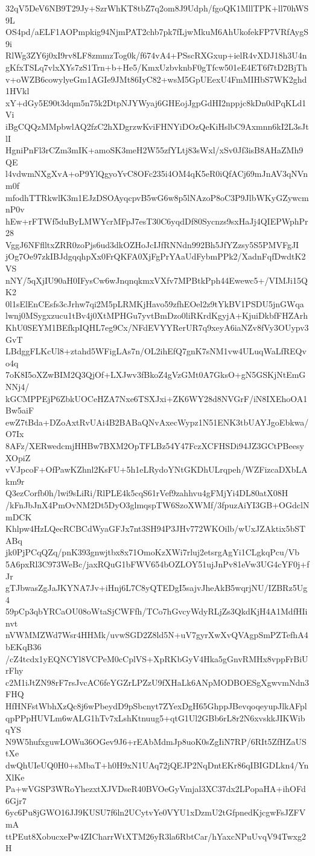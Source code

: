 32qV5DeV6NB9T29Jy+SzrWhKT8tbZ7q2om8J9Udph/fgoQK1MllTPK+ll70hWS9L
OS4pd/aELF1AOPmpkig94NjmPAT2chb7pk7fLjwMkuM6AhUkofekFP7VRfAygS9i
RlWg3ZY6j0xI9rv8LF8zmmzTog0k/f674vA4+PSscRXGxup+ielR4vXDJ18h3U4n
gKfxTSLq7vlxXYs7zS1Trn+b+He5/KmxUzbvknbF0gTfcw501eE4ET6f7tD2BjTh
v+oWZB6cowylyeGm1AGIe9JMt86IyC82+wsM5GpUEexU4FmMIHbS7WK2ghd1HVkl
xY+dGy5E90t3dqm5n75k2DtpNJYWyaj6GHEojJgpGdHI2nppjc8kDn0dPqKLd1Vi
iBgCQQzMMpbwlAQ2fzC2hXDgrzwKviFHNYiDOzQeKiHslbC9Axmnn6kI2L3sJtlI
HgniPnFl3rCZm3mIK+amoSK3meH2W55zfYLtj83sWxl/xSv0Jf3isB8AHaZMh9QE
l4vdwmNXgXvA+oP9YlQgyoYvC8OFc235i4OM4qK5eR0iQfACj69mJnAV3qNVnm0f
mfodhTTRkwlK3m1EJzDSOAyqcpvB5wG6w8p5lNAzoP8oC3P9JlbWKyGZywcmnP0v
hEw+rFTWf5duByLMWYcrMFpJ7esT30C6yqdDf80Sycnzs9sxHaJj4QIEPWphPr28
VggJ6NFflltxZRR0zoPjs6ud3dkOZHoJcIJfRNNdn992Bh5JfYZzsy5S5PMVFgJI
jOg7Oe97zkIBJdgqqhpXx0FrQKFA0XjFgPrYAaUdFybmPPk2/XadnFqfDwdtK2VS
nNY/5qXjIU90aH0IFysCw6wJnqnqkmxVXfv7MPBtkPph44Ewewc5+/VIMJi15QK2
0l1sElEnCEsfs3cJrhw7qi2M5pLRMKjHavo59zfhEOel2z9tYkBV1PSDU5jnGWqa
lwnj0MSygxzucu1tBv4j0XtMPHGu7yvtBmDzo0liRKrdKgyjA+KjuiDkbfFHZArh
KhU0SEYM1BEfkpIQHL7eg9Cx/NFdEVYYRerUR7q9xeyA6iaNZv8fVy3OUypv3GvT
LBdggFLKcUl8+ztahd5WFigLAs7n/OL2ihEfQ7gnK7sNM1vw4ULuqWaLfREQvo4q
7oK8I5oXZwBIM2Q3QjOf+LXJwv3fBkoZ4gVzGMt0A7GksO+gN5GSKjNtEmGNNj4/
kGCMPPEjP6ZbkUOCeHZA7Nxe6TSXJxi+ZK6WY28d8NVGrF/iN8IXEhoOA1Bw5aiF
ewZ7tBda+DZoAxtRvUAi4B2BABaQNvAxecWypz1N51ENK3tbUAYJgoEbkwa/O7Ix
8AFz/XERwedcmjHHBw7BXM2OpTFLBz54Y47FczXCFHSDi94JZ3GCtPBeesyXOpiZ
vVJpcoF+OfPawKZhnl2KsFU+5h1eLRydoYNtGKDhULrqpeh/WZFizcaDXbLAkm9r
Q3ezCorfb0h/lwi9sLiRi/RlPLE4k5cqS61rVef9zahhvu4gFMjYi4DL80atX08H
/kFnJbJnX4PmOvNM2Dt5DyO3glmqspTW6SzoXWMf/3fpuzAiYI3GB+OGdclNmDCK
Khlpw4HzLQecRCBCdWyaGFJx7nt3SH94P3JHv772WKOilb/wUxJZAktix5bSTABq
jk0PjPCqQZq/pnK393gnwjtbx8x71OmoKzXWi7rluj2etsrgAgYi1CLgkqPcu/Vb
5A6pxRl3C973WeBc/jaxRQuG1bFWV654bOZLOY51ujJnPv81eVw3UG4cYF0j+fJr
gTJbwasZgJaJKYNA7Jv+iHnj6L7C8yQTEDgI5sajvJheAkB5wqrjNU/IZBRz5Ug4
59pCp3qbYRCaOU08oWtaSjCWFfh/TCo7hGvcyWdyRLjZs3QkdKjH4A1MdfHIinvt
nVWMMZWd7Wsr4HHMk/uvwSGD2Z8ld5N+uV7gyrXwXvQVAgpSmPZTefhA4bEKqB36
/cZ4tcdx1yEQNCYl8VCPeM0cCplVS+XpRKbGyV4Hka5gGnvRMHx8vppFrBiUrFhy
c2M1iJtZN98rF7rsJvcAC6feYGZrLPZzU9fXHaLk6ANpMODBOESgXgwvmNdn3FHQ
HfHNFstWbhXzQc8j6wPbeydD9pSbcnyt7ZYexDgH65GhppJBevqoqeyupJlkAFpl
qpPPpHUVLm6wALG1hTv7xLshKtnuug5+qtG1Ul2GBb6rL8r2N6xvskkJIKWibqYS
N9W5hufxguwLOWu36OGev9J6+rEAbMdmJp8uoK0sZgIiN7RP/6RIt5ZfHZaUStXe
dwQhUIeUQ0H0+sMbaT+h0H9xN1UAq72jQEJP2NqDntEKr86qIBIGDLkn4/YnXlKe
Pa+wVGSP3WRoYhezxtXJVDseR40BVOeGyVmjal3XC37dx2LPopaHA+ihOFd6Gjr7
6yc6Pu8jGWO16JJ9KUSU7f6ln2UCytvYe0VYU1xDzmU2tGfpnedKjcgwFsJZFVmA
ttPEut8XobucxePw4ZICharrWtXTM26yR3la6RbtCar/hYaxcNPuUvqV94Twxg2H
